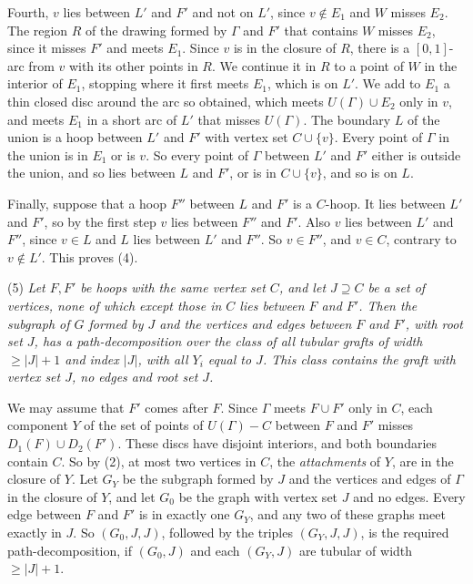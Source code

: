 {Fourth, $v$ lies between $L'$ and $F'$ and not on $L'$, since $v \notin E_1$ and $W$ misses $E_2$. The region $R$ of the drawing formed by $\Gamma$ and $F'$ that contains $W$ misses $E_2$, since it misses $F'$ and meets $E_1$. Since $v$ is in the closure of $R$, there is a $[0,1]$-arc from $v$ with its other points in $R$. We continue it in $R$ to a point of $W$ in the interior of $E_1$, stopping where it first meets $E_1$, which is on $L'$. We add to $E_1$ a thin closed disc around the arc so obtained, which meets $U(\Gamma) \cup E_2$ only in $v$, and meets $E_1$ in a short arc of $L'$ that misses $U(\Gamma)$. The boundary $L$ of the union is a hoop between $L'$ and $F'$ with vertex set $C \cup \{v\}$. Every point of $\Gamma$ in the union is in $E_1$ or is $v$. So every point of $\Gamma$ between $L'$ and $F'$ either is outside the union, and so lies between $L$ and $F'$, or is in $C \cup \{v\}$, and so is on $L$.

Finally, suppose that a hoop $F''$ between $L$ and $F'$ is a $C$-hoop. It lies between $L'$ and $F'$, so by the first step $v$ lies between $F''$ and $F'$. Also $v$ lies between $L'$ and $F''$, since $v \in L$ and $L$ lies between $L'$ and $F''$. So $v \in F''$, and $v \in C$, contrary to $v \notin L'$. This proves (4).

\hspace*{12pt}(5) \textit{Let $F, F'$ be hoops with the same vertex set $C$, and let $J \supseteq C$ be a set of vertices, none of which except those in $C$ lies between $F$ and $F'$. Then the subgraph of $G$ formed by $J$ and the vertices and edges between $F$ and $F'$, with root set $J$, has a path-decomposition over the class of all tubular grafts of width $\ge |J| + 1$ and index $|J|$, with all $Y_i$ equal to $J$. This class contains the graft with vertex set $J$, no edges and root set $J$.}

We may assume that $F'$ comes after $F$. Since $\Gamma$ meets $F \cup F'$ only in $C$, each component $Y$ of the set of points of $U(\Gamma) - C$ between $F$ and $F'$ misses $D_1(F) \cup D_2(F')$. These discs have disjoint interiors, and both boundaries contain $C$. So by (2), at most two vertices in $C$, the \textit{attachments} of $Y$, are in the closure of $Y$. Let $G_Y$ be the subgraph formed by $J$ and the vertices and edges of $\Gamma$ in the closure of $Y$, and let $G_0$ be the graph with vertex set $J$ and no edges. Every edge between $F$ and $F'$ is in exactly one $G_Y$, and any two of these graphs meet exactly in $J$. So $(G_0, J, J)$, followed by the triples $(G_Y, J, J)$, is the required path-decomposition, if $(G_0, J)$ and each $(G_Y, J)$ are tubular of width $\ge |J| + 1$.

}
